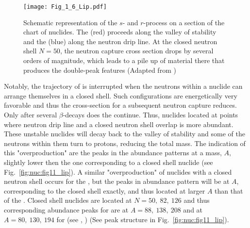\begin{figure}[t]
    \centering
    \texttt{[image: Fig\_1\_6\_Lip.pdf]}
    \caption{Schematic representation of the $s$- and $r$-process on a section of the
        chart of nuclides. The \sproc{} (red) proceeds along the valley of stability and the
        \rproc{} (blue) along the neutron drip line. At the closed neutron shell $N = 50$, the
        neutron capture cross section drops by several orders of magnitude, which leads to a
        pile up of material there that produces the double-peak features
        (Adapted from \citet{Lippuner:2018phd})
    }
    \label{fig:nuc:fig16_lip}
\end{figure}

Notably, the trajectory of \rproc{} is interrupted when the neutrons within a nuclide can arrange 
themselves in a closed shell. Such configurations are energetically very favorable and thus the 
cross-section for a subsequent neutron capture reduces. Only after several $\beta$-decays does the 
\rproc{} continue. Thus, nuclides located at points where neutron drip line and a closed neutron 
shell overlap is more abundant. These unstable nuclides will decay back to the valley of stability 
and some of the neutrons within them turn to protons, reducing the total mass. The indication 
of this "overproduction" are the peaks in the abundance patterns at a mass, $A$, slightly lower then 
the one corresponding to a closed shell nuclide (see Fig.~\ref{fig:nuc:fig11_lip}).
%
A similar "overproduction" of nuclides with a closed neutron shell occurs for the \sproc{}, 
but the peaks in abundance pattern will be at $A$, corresponding to the closed shell exactly, 
and thus located at larger $A$ than that of the \rproc{}. 
%
Closed shell nuclides are located at 
$N=50,\: 82, \: 126$ and thus corresponding abundance peaks for \sproc{} are at 
$A=88, \: 138, \: 208$ and at $A=80,\:130,\:194$ for \rproc{} (see \eg, \citet{Arnould:2007gh}) 
(See peak structure in Fig.~\ref{fig:nuc:fig11_lip}).


